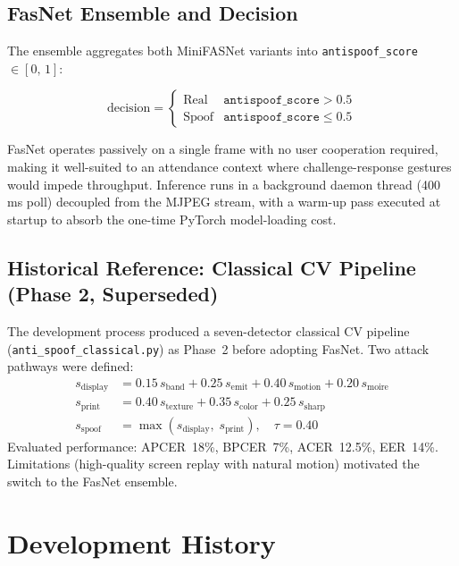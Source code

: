 \documentclass[10pt,a4paper]{article}
\begin{document}
\subsection{FasNet Ensemble and Decision}

The ensemble aggregates both MiniFASNet variants into \texttt{antispoof\_score}
$\in [0,\,1]$:

\begin{equation}
  \text{decision} = \begin{cases}
    \text{Real}  & \texttt{antispoof\_score} > 0.5 \\
    \text{Spoof} & \texttt{antispoof\_score} \leq 0.5
  \end{cases}
  \label{eq:fasnet}
\end{equation}

FasNet operates passively on a single frame with no user cooperation required,
making it well-suited to an attendance context where challenge-response gestures
would impede throughput.
Inference runs in a background daemon thread (400\,ms poll) decoupled from the
MJPEG stream, with a warm-up pass executed at startup to absorb the one-time
PyTorch model-loading cost.

\subsection{Historical Reference: Classical CV Pipeline (Phase 2, Superseded)}

The development process produced a seven-detector classical CV pipeline
(\texttt{anti\_spoof\_classical.py}) as Phase~2 before adopting FasNet.
Two attack pathways were defined:
\begin{align}
  s_\text{display} &= 0.15\,s_\text{band} + 0.25\,s_\text{emit} + 0.40\,s_\text{motion} + 0.20\,s_\text{moire}
  \label{eq:display}\\
  s_\text{print}   &= 0.40\,s_\text{texture} + 0.35\,s_\text{color} + 0.25\,s_\text{sharp}
  \label{eq:print}\\
  s_\text{spoof}   &= \max(s_\text{display},\;s_\text{print}),\quad\tau=0.40
  \label{eq:fusion}
\end{align}
Evaluated performance: APCER~18\%, BPCER~7\%, ACER~12.5\%, EER~14\%.
Limitations (high-quality screen replay with natural motion) motivated the switch
to the FasNet ensemble.

\section{Development History}
\label{sec:devhistory}
\end{document}
